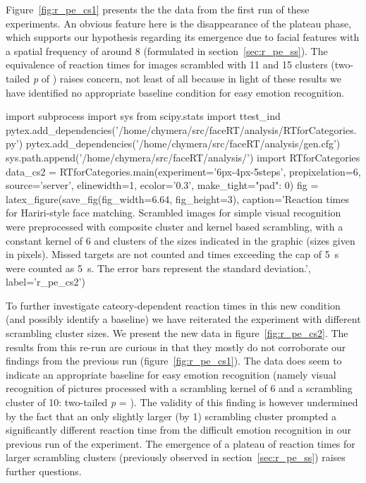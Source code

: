 	    Figure~\ref{fig:r_pe_cs1} presents the the data from the first run of these experiments.
	    An obvious feature here is the disappearance of the plateau phase, which supports our hypothesis regarding its emergence due to facial features with a spatial frequency of around \SI{8}{\pixel} (formulated in section~\ref{sec:r_pe_ss}).
	    The equivalence of reaction times for images scrambled with \SI{11}{\pixel} and \SI{15}{\pixel} clusters (two-tailed \textit{p} of ) raises concern, not least of all because in light of these results we have identified no appropriate baseline condition for easy emotion recognition.
	    \begin{pycode}
		import subprocess
		import sys
		from scipy.stats import ttest_ind
		pytex.add_dependencies('/home/chymera/src/faceRT/analysis/RTforCategories.py')
		pytex.add_dependencies('/home/chymera/src/faceRT/analysis/gen.cfg')
		sys.path.append('/home/chymera/src/faceRT/analysis/')
		import RTforCategories
		data_cs2 = RTforCategories.main(experiment='6px-4px-5steps', prepixelation=6, source='server', elinewidth=1, ecolor='0.3', make_tight={"pad": 0})
		fig = latex_figure(save_fig(fig_width=6.64, fig_height=3), caption='Reaction times for Hariri-style face matching. Scrambled images for simple visual recognition were preprocessed with composite cluster and kernel based scrambling, with a constant kernel of \SI{6}{\pixel} and clusters of the sizes indicated in the graphic (sizes given in pixels). Missed targets are not counted and times exceeding the cap of \SI{5}{\second} were counted as \SI{5}{\second}. The error bars represent the standard deviation.', label='r_pe_cs2')
	    \end{pycode}
	    
	    To further investigate cateory-dependent reaction times in this new condition (and possibly identify a baseline) we have reiterated the experiment with different scrambling cluster sizes.
	    We present the new data in figure~\ref{fig:r_pe_cs2}.
	    The results from this re-run are curious in that they mostly do not corroborate our findings from the previous run (figure~\ref{fig:r_pe_cs1}).
	    The data does seem to indicate an appropriate baseline for easy emotion recognition (namely visual recognition of pictures processed with a scrambling kernel of \SI{6}{\pixel} and a scrambling cluster of \SI{10}{\pixel}: two-tailed \textit{p} = ).
	    The validity of this finding is however undermined by the fact that an only slightly larger (by \SI{1}{\pixel}) scrambling cluster prompted a significantly different reaction time from the difficult emotion recognition in our previous run of the experiment.
	    The emergence of a plateau of reaction times for larger scrambling clusters (previously observed in section~\ref{sec:r_pe_ss}) raises further questions.
	    
